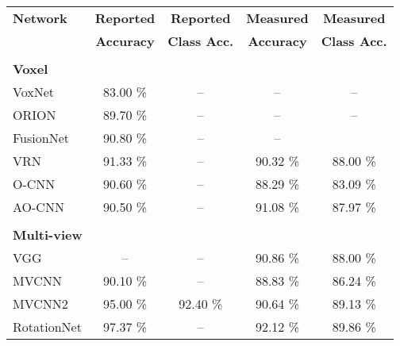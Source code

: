 \begin{table}[]
	\centering
	\begin{tabular}{lcccc}
		\hline
		\textbf{Network}     & \textbf{Reported } & \textbf{Reported} & \textbf{Measured} & \textbf{Measured} \\
		                     & \textbf{Accuracy } &    \textbf{Class Acc.}    & \textbf{Accuracy} &    \textbf{Class Acc.}    \\ \hline
		                     &                    &                         &                   &                         \\
		\textbf{Voxel }      &                    &                         &                   &                         \\
		VoxNet               &      83.00 \%      &           --            &        --         &           --            \\
		ORION                &      89.70 \%      &           --            &        --         &           --            \\
		FusionNet            &      90.80 \%      &           --            &        --         &                         \\
		VRN                  &      91.33 \%      &           --            &     90.32 \%      &        88.00 \%         \\
		O-CNN                &      90.60 \%      &           --            &     88.29 \%      &        83.09 \%         \\
		AO-CNN               &      90.50 \%      &           --            &     91.08 \%      &        87.97 \%         \\ \hline
		                     &                    &                         &                   &                         \\
		\textbf{Multi-view}  &                    &                         &                   &                         \\
		VGG                  &         --         &           --            &     90.86 \%      &        88.00 \%         \\
		MVCNN                &      90.10 \%      &           --            &     88.83 \%      &        86.24 \%         \\
		MVCNN2               &      95.00 \%      &        92.40 \%         &     90.64 \%      &        89.13 \%         \\
		RotationNet          &      97.37 \%      &           --            &     92.12 \%      &        89.86 \%         \\

\end{tabular}
\end{table}
